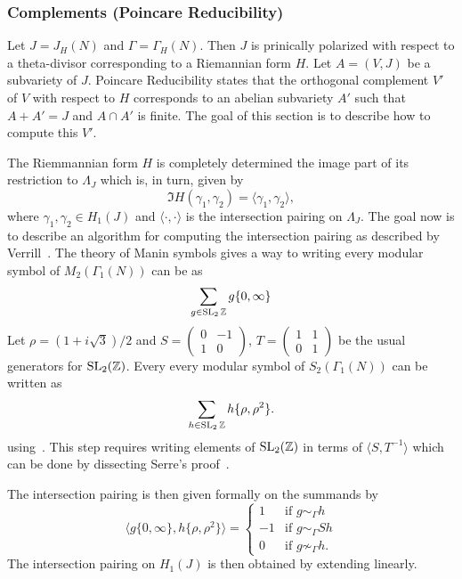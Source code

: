 \documentclass{article}
\begin{document}
\subsubsection{Complements (Poincare Reducibility)}\label{sec:poincare}

Let $J=J_H(N)$ and $\Gamma=\Gamma_H(N)$. Then $J$ is prinically polarized with
respect to a theta-divisor corresponding to a Riemannian form $H$. Let $A=(V,
	J)$ be a subvariety of $J$. Poincare Reducibility states that the orthogonal
complement $V'$ of $V$ with respect to $H$ corresponds to an abelian subvariety
$A'$ such that $A+A'=J$ and $A\cap A'$ is finite. The goal of this section is
to describe how to compute this $V'$.

The Riemmannian form $H$ is completely determined the image part of its
restriction to $\Lambda_J$ which is, in turn, given by
\[
	\Im H(\gamma_1, \gamma_2) = \langle \gamma_1, \gamma_2 \rangle,
\]
where $\gamma_1, \gamma_2\in H_1(J)$ and $\langle \cdot,\cdot \rangle$ is the
intersection pairing on $\Lambda_J$. The goal now is to describe an algorithm
for computing the intersection pairing as described by Verrill~\cite[\S
	4]{verrill:intersection}. The theory of Manin symbols gives a way to writing
every modular symbol of $M_2(\Gamma_1(N))$ can be as
\[
	\sum_{g\in \operatorname{SL}_2{\mathbb{Z}}} g\{0, \infty\}
\]
Let $\rho=(1+i\sqrt{3})/2$ and
$S = \left(
	\begin{smallmatrix}
			0 & -1 \\
			1 & 0
		\end{smallmatrix}
	\right)$,
$T = \left(
	\begin{smallmatrix}
			1 & 1 \\
			0 & 1
		\end{smallmatrix}
	\right)$ be the usual generators for $\operatorname{SL}_2(\mathbb{Z})$.
Every every modular symbol of $S_2(\Gamma_1(N))$ can be written as
\[
	\sum_{h\in \operatorname{SL}_2{\mathbb{Z}}} h\{\rho, \rho^2\}.
\]
using~\cite[Corollary 4.1]{verrill:intersection}. This step requires writing
elements of $\operatorname{SL}_2(\mathbb{Z})$ in terms of $ \langle S, T^{-1} \rangle$ which can be
done by dissecting Serre's proof~\cite[Chapter 7, Theorem 2]{MR0344216}.

The intersection pairing is then given formally on the summands by
\[
	\langle g\{0,\infty\}, h\{\rho, \rho^2\} \rangle
	=
	\begin{cases}
		1  & \text{if } g\sim_\Gamma h      \\
		-1 & \text{if } g\sim_\Gamma Sh     \\
		0  & \text{if } g\not\sim_\Gamma h.
	\end{cases}
\]
The intersection pairing on $H_1(J)$ is then obtained by extending linearly.
\end{document}
